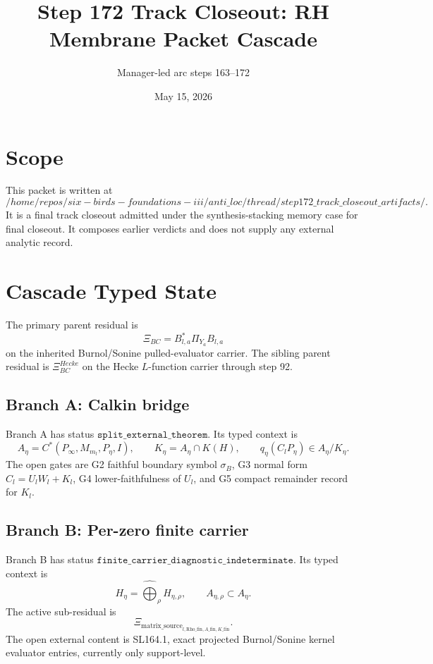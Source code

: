 \documentclass[11pt]{article}
\title{Step 172 Track Closeout: RH Membrane Packet Cascade}
\author{Manager-led arc steps 163--172}
\date{May 15, 2026}
\begin{document}
\maketitle

\section{Scope}

This packet is written at
\[
/home/repos/six-birds-foundations-iii/anti\_loc/thread/step172\_track\_closeout\_artifacts/.
\]
It is a final track closeout admitted under the synthesis-stacking memory case for final closeout. It composes earlier verdicts and does not supply any external analytic record.

\section{Cascade Typed State}

The primary parent residual is
\[
\Xi_{BC}=B^*_{l,a}\Pi_{Y_a}B_{l,a}
\]
on the inherited Burnol/Sonine pulled-evaluator carrier. The sibling parent residual is \(\Xi_{BC}^{Hecke}\) on the Hecke \(L\)-function carrier through step 92.

\subsection*{Branch A: Calkin bridge}

Branch A has status \(\texttt{split\_external\_theorem}\). Its typed context is
\[
A_\eta=C^*(P_\infty,M_{m_l},P_\eta,I),\qquad
K_\eta=A_\eta\cap K(H),\qquad q_\eta(C_lP_\eta)\in A_\eta/K_\eta .
\]
The open gates are G2 faithful boundary symbol \(\sigma_B\), G3 normal form \(C_l=U_lW_l+K_l\), G4 lower-faithfulness of \(U_l\), and G5 compact remainder record for \(K_l\).

\subsection*{Branch B: Per-zero finite carrier}

Branch B has status \(\texttt{finite\_carrier\_diagnostic\_indeterminate}\). Its typed context is
\[
H_\eta=\widehat{\bigoplus}_\rho H_{\eta,\rho},\qquad A_{\eta,\rho}\subset A_\eta .
\]
The active sub-residual is
\[
\Xi_{\mathrm{matrix\_source}_{l,\mathrm{Rho\_fin},A\_\mathrm{fin},K\_\mathrm{fin}}}.
\]
The open external content is SL164.1, exact projected Burnol/Sonine kernel evaluator entries, currently only support-level.
\end{document}
